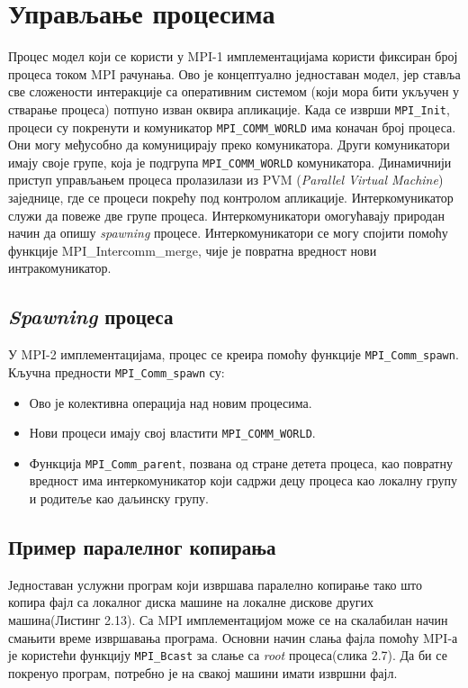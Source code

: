 \section{Управљање процесима}
Процес модел који се користи у MPI-1 имплементацијама користи фиксиран број процеса током MPI рачунања. Ово је концептуално једноставан модел, јер ставља све сложености интеракције са оперативним системом (који мора бити 
укључен у стварање процеса) потпуно изван оквира апликације. Када се изврши \texttt{MPI\_Init}, процеси су покренути и комуникатор \texttt{MPI\_COMM\_WORLD} има коначан број процеса. Они могу међусобно да комуницирају преко комуникатора. Други комуникатори имају своје групе, која је подгрупа \texttt{MPI\_COMM\_WORLD} комуникатора. Динамичнији приступ управљањем процеса пролазилази из \gls{PVM} (\textit{Parallel Virtual Machine}) заједнице, где се процеси покрећу под контролом апликације. Интеркомуникатор служи да повеже две групе процеса. Интеркомуникатори омогућавају природан начин да опишу \textit{spawning} процесе. Интеркомуникатори се могу спојити помоћу функције MPI\_Intercomm\_merge, чије је повратна вредност нови интракомуникатор.

\subsection{\textit{Spawning} процеса}
У MPI-2 имплементацијама, процес се креира помоћу функције \texttt{MPI\_Comm\_spawn}. Кључна предности \texttt{MPI\_Comm\_spawn} су:

\begin{itemize}
	\item Ово је колективна операција над новим процесима.
	\item Нови процеси имају свој властити \texttt{MPI\_COMM\_WORLD}.
	\item Функција \texttt{MPI\_Comm\_parent}, позвана од стране детета процеса, као повратну вредност има интеркомуникатор који садржи децу процеса као локалну групу и родитеље као даљинску групу.
\end{itemize}

\subsection{Пример паралелног копирања}

Једноставан услужни програм који извршава паралелно копирање тако што копира фајл са локалног диска машине на локалне дискове других машина(Листинг 2.13). Са MPI имплементацијом може се на скалабилан начин смањити време извршавања програма. Основни начин слања фајла помоћу MPI-а је користећи функцију  \texttt{MPI\_Bcast} за слање са \textit{root} процеса(слика 2.7). Да би се покренуо програм, потребно је на свакој машини имати извршни фајл. 

